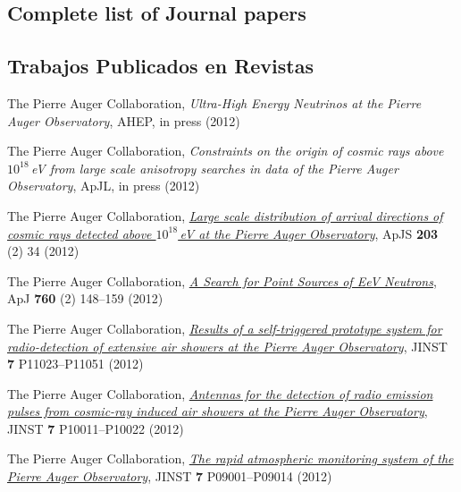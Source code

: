 \ifeng
\subsection*{Complete list of Journal papers}
\else
\subsection*{Trabajos Publicados en Revistas}
\fi
\noindent
\begin{etaremune}

\item {}The Pierre Auger Collaboration, {\emph{Ultra-High Energy
Neutrinos at the Pierre Auger Observatory}}, AHEP, in press (2012)

\item {}The Pierre Auger Collaboration, {\emph{Constraints on the
origin of cosmic rays above $10^{18}$\,eV from large scale anisotropy searches
in data of the Pierre Auger Observatory}}, ApJL, in press (2012)

\item {}The Pierre Auger Collaboration,
\href{http://dx.doi.org/10.1088/0067-0049/203/2/34}{\emph{Large scale
distribution of arrival directions of cosmic rays detected above $10^{18}$\,eV
at the Pierre Auger Observatory}}, ApJS {\bf{203}} (2) 34 (2012)

\item {}The Pierre Auger Collaboration,
\href{http://dx.doi.org/10.1088/0004-637X/760/2/148}{\emph{A Search for Point
Sources of EeV Neutrons}}, ApJ {\bf{760}} (2) 148--159 (2012)

\item {}The Pierre Auger Collaboration,
\href{http://dx.doi.org/10.1088/1748-0221/7/11/P11023}{\emph{Results of a
self-triggered prototype system for radio-detection of extensive air showers at
the Pierre Auger Observatory}}, JINST {\bf{7}} P11023--P11051 (2012)

\item {}The Pierre Auger Collaboration,
\href{http://dx.doi.org/10.1088/1748-0221/7/10/P10011}{\emph{Antennas for the
detection of radio emission pulses from cosmic-ray induced air showers at the
Pierre Auger Observatory}}, JINST {\bf{7}} P10011--P10022 (2012)

\item {}The Pierre Auger Collaboration,
\href{http://dx.doi.org/10.1088/1748-0221/7/09/P09001}{\emph{The rapid
atmospheric monitoring system of the Pierre Auger Observatory}}, JINST
{\bf{7}} P09001--P09014 (2012)


\end{etaremune}
